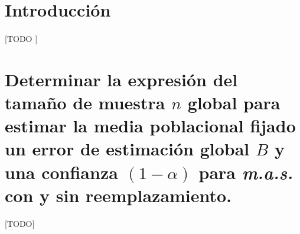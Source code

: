\documentclass{article}
\begin{document}
  \maketitle


  \section{Introducción}

    \paragraph{}
    [TODO ]

  \section{Determinar la expresión del tamaño de muestra $n$ global para estimar la media poblacional fijado un error de estimación global $B$ y una confianza $(1-\alpha)$ para \emph{m.a.s.} con y sin reemplazamiento.}

    \paragraph{}
    [TODO]


  \nocite{muest2017}
  \nocite{sarndal2003model}

  
  
\end{document}
